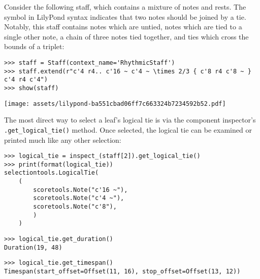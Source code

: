Consider the following staff, which contains a mixture of notes and rests. The
\texttt{~} symbol in LilyPond syntax indicates that two notes should be joined
by a tie. Notably, this staff contains notes which are untied, notes which are
tied to a single other note, a chain of three notes tied together, and ties
which cross the bounds of a triplet:

\begin{comment}
<abjad>
staff = Staff(context_name='RhythmicStaff')
staff.extend(r"c'4 r4.. c'16 ~ c'4 ~ \times 2/3 { c'8 r4 c'8 ~ } c'4 r4 c'4")
show(staff)
</abjad>
\end{comment}

\begin{abjadbookoutput}
\begin{singlespacing}
\vspace{-0.5\baselineskip}
\begin{verbatim}
>>> staff = Staff(context_name='RhythmicStaff')
>>> staff.extend(r"c'4 r4.. c'16 ~ c'4 ~ \times 2/3 { c'8 r4 c'8 ~ } c'4 r4 c'4")
>>> show(staff)
\end{verbatim}
\noindent\texttt{[image: assets/lilypond-ba551cbad06ff7c663324b7234592b52.pdf]}
\end{singlespacing}
\end{abjadbookoutput}

\noindent The most direct way to select a leaf's logical tie is via the
component inspector's \texttt{.get\_logical\_tie()} method. Once selected, the
logical tie can be examined or printed much like any other selection:

\begin{comment}
<abjad>
logical_tie = inspect_(staff[2]).get_logical_tie()
print(format(logical_tie))
logical_tie.get_duration()
logical_tie.get_timespan()
</abjad>
\end{comment}

\begin{abjadbookoutput}
\begin{singlespacing}
\vspace{-0.5\baselineskip}
\begin{verbatim}
>>> logical_tie = inspect_(staff[2]).get_logical_tie()
>>> print(format(logical_tie))
selectiontools.LogicalTie(
    (
        scoretools.Note("c'16 ~"),
        scoretools.Note("c'4 ~"),
        scoretools.Note("c'8"),
        )
    )
\end{verbatim}
\begin{verbatim}
>>> logical_tie.get_duration()
Duration(19, 48)
\end{verbatim}
\begin{verbatim}
>>> logical_tie.get_timespan()
Timespan(start_offset=Offset(11, 16), stop_offset=Offset(13, 12))
\end{verbatim}
\end{singlespacing}
\end{abjadbookoutput}

